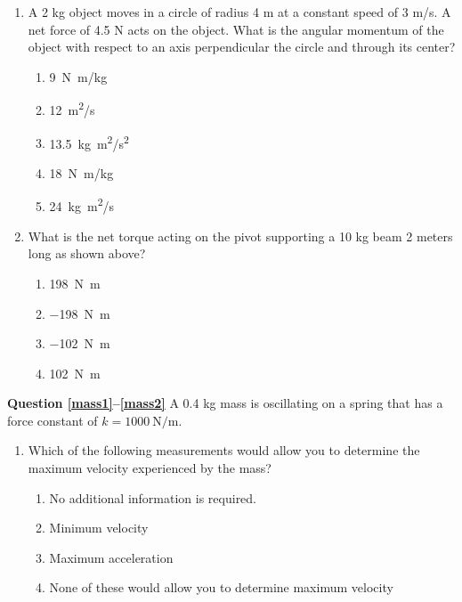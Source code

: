\documentclass[11pt]{article}
\begin{document}
\begin{multicols}{2}
\begin{enumerate}[leftmargin=18pt,resume]
  \item A 2 kg object moves in a circle of radius 4 m at a constant speed of
    3 m/s. A net force of 4.5 N acts on the object. What is the angular
    momentum of the object with respect to an axis perpendicular the circle
    and through its center?
    \begin{enumerate}[nosep,leftmargin=18pt,label=(\Alph*)]
    \item\SI{9}{N.m/kg}
    \item\SI{12}{m^2/s}
    \item\SI{13.5}{kg.m^2/s^2}
    \item\SI{18}{N.m/kg}
    \item\SI{24}{kg.m^2/s}
    \end{enumerate}
    \vspace{.7in}
    
    \begin{center}
    \end{center}
    
  \item What is the net torque acting on the pivot supporting a 10 kg beam 2
    meters long as shown above?
    \begin{enumerate}[nosep,leftmargin=18pt,label=(\Alph*)]
    \item\SI{198}{\newton.\metre}
    \item\SI{-198}{\newton.\metre}
    \item\SI{-102}{\newton.\metre}
    \item\SI{102}{\newton.\metre}
    \end{enumerate}
    \columnbreak
  \end{enumerate}   
  
  \textbf{Question \ref{mass1}--\ref{mass2}} A 0.4 kg mass is oscillating on a
  spring that has a force constant of $k=\SI{1000}{\newton\per\metre}$.
  \begin{enumerate}[leftmargin=18pt,resume]
  \item Which of the following measurements would allow you to determine the
    maximum velocity experienced by the mass?
    \label{mass1}
    \begin{enumerate}[noitemsep,topsep=0pt,leftmargin=18pt,label=(\Alph*)]
    \item No additional information is required.
    \item Minimum velocity
    \item Maximum acceleration
    \item None of these would allow you to determine maximum velocity
    \end{enumerate}
    \columnbreak
    

\end{enumerate}
\end{multicols}
\end{document}
